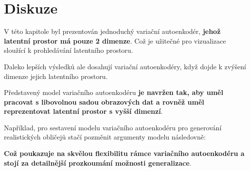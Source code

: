 \section{Diskuze}
\label{sec:vae_model_discussion}
V této kapitole byl prezentován jednoduchý variační autoenkodér, \textbf{jehož latentní prostor má pouze 2 dimenze}.
Což je užitečné pro vizualizace sloužící k prohledávání latentního prostoru.

Daleko lepších výsledků ale dosahují variační autoenkodéry, když dojde k zvýšení dimenze jejich latentního prostoru.

Představený model variačního autoenkodéru \textbf{je navržen tak, aby uměl pracovat s libovolnou sadou obrazových dat a rovněž uměl reprezentovat latentní prostor s vyšší dimenzí}.

Například, pro sestavení modelu variačního autoenkodéru pro generování realistických obličejů stačí pozměnit argumenty modelu následovně:




\textbf{Což poukazuje na skvělou flexibilitu rámce variačního autoenkodéru a stojí za detailnější prozkoumání možnosti generalizace}.